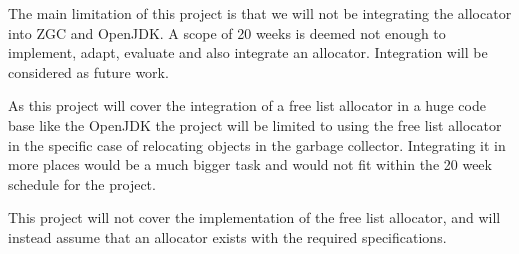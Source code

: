 
The main limitation of this project is that we will not be integrating the allocator into ZGC and OpenJDK. A scope of 20 weeks is deemed not enough to implement, adapt, evaluate and also integrate an allocator. Integration will be considered as future work.



As this project will cover the integration of a free list allocator in a huge code base like the OpenJDK the project will be limited to using the free list allocator in the specific case of relocating objects in the garbage collector. Integrating it in more places would be a much bigger task and would not fit within the 20 week schedule for the project.

This project will not cover the implementation of the free list allocator, and will instead assume that an allocator exists with the required specifications. 
